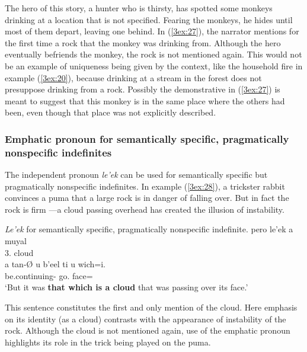 \documentclass[output=paper]{langsci/langscibook}
\begin{document}
The hero of this story, a hunter who is thirsty, has spotted some monkeys drinking at a location that is not specified.  Fearing the monkeys, he hides until most of them depart, leaving one behind.  In (\ref{3ex:27}), the narrator mentions for the first time a rock that the monkey was drinking from.  Although the hero eventually befriends the monkey, the rock is not mentioned again.  This would not be an example of uniqueness being given by the context, like the household fire in example (\ref{3ex:20}), because drinking at a stream in the forest does not presuppose drinking from a rock.  Possibly the demonstrative in (\ref{3ex:27}) is meant to suggest that this monkey is in the same place where the others had been, even though that place was not explicitly described.


\subsubsection{Emphatic pronoun for semantically specific, pragmatically nonspecific indefinites}\label{3sec:343}

The independent pronoun {\emph{le'ek}} can be used for semantically specific but pragmatically nonspecific indefinites. In example (\ref{3ex:28}), a trickster rabbit convinces a puma that a large rock is in danger of falling over. But in fact the rock is firm ---a cloud passing overhead has created the illusion of instability.

\begin{exe}
\ex\label{3ex:28}
{\emph{Le'ek}} for semantically specific, pragmatically nonspecific indefinite. 
\exi{}
\gll	pero			le'ek 			a	muyal \\
	{}		3.{}	{}	cloud \\
\glt
\exi{}
\gll	a 	tan-{\O}				u		b’eel			ti			u		wich=i. \\
	{}	be.continuing-{}	{}	go.{}	{}		{}	face={} \\
\glt	`But it was {\bf{that which is a cloud}} that was passing over its face.'
\end{exe}

This sentence constitutes the first and only mention of the cloud. Here emphasis on its identity (as a cloud) contrasts with the appearance of instability of the rock. Although the cloud is not mentioned again, use of the emphatic pronoun highlights its role in the trick being played on the puma.
\end{document}
